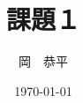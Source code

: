 \documentclass[a4paper,11pt]{jsarticle}
\begin{document}
\title{課題１}
\author{岡　恭平}
\date{\today}
\maketitle
\end{document}
